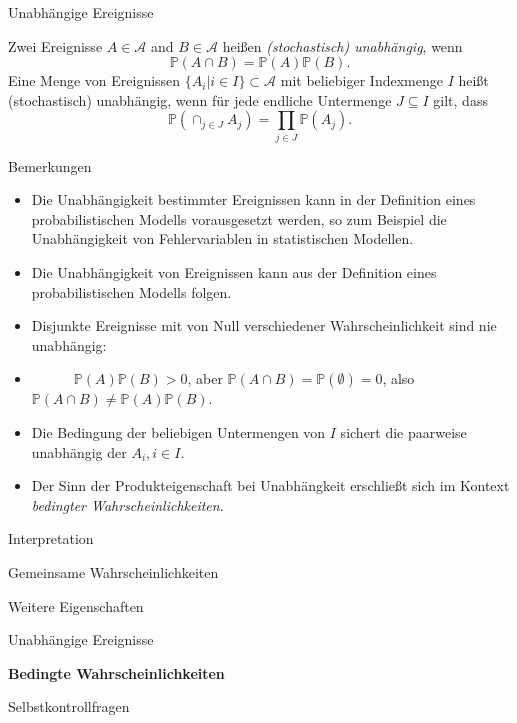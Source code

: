 \documentclass[
  8pt,
  ignorenonframetext,
]{beamer}
\begin{document}
\begin{frame}{Unabhängige Ereignisse}
\protect\hypertarget{unabhuxe4ngige-ereignisse}{}
\small
\begin{definition}
\justifying
Zwei Ereignisse $A \in \mathcal{A}$ and $B \in \mathcal{A}$ heißen
\textit{(stochastisch) unabhängig}, wenn
\begin{equation}
\mathbb{P}(A \cap B) = \mathbb{P}(A)\mathbb{P}(B).
\end{equation}
Eine Menge von Ereignissen $\{A_i|i \in I\}\subset \mathcal{A}$ mit beliebiger
Indexmenge $I$ heißt (stochastisch) unabhängig, wenn für jede endliche Untermenge
$J \subseteq I$ gilt, dass
\begin{equation}
\mathbb{P}\left(\cap_{j \in J} A_j \right) = \prod_{j \in J}\mathbb{P}(A_j).
\end{equation}
\end{definition}
\vspace{-2mm}
\footnotesize

Bemerkungen \vspace{-1mm}

\begin{itemize}
\justifying
\itemsep1mm
\item Die Unabhängigkeit bestimmter Ereignissen kann in der Definition eines
probabilistischen Modells vorausgesetzt werden, so zum Beispiel die Unabhängigkeit
von Fehlervariablen in statistischen Modellen.
\item Die Unabhängigkeit von Ereignissen kann aus der Definition eines probabilistischen Modells folgen.
\item Disjunkte Ereignisse mit von Null verschiedener Wahrscheinlichkeit sind nie unabhängig:
\item[] $\quad\quad\quad \mathbb{P}(A)\mathbb{P}(B) > 0$, aber $\mathbb{P}(A \cap B) = \mathbb{P}(\emptyset) = 0$, also
$\mathbb{P}(A \cap B) \neq \mathbb{P}(A)\mathbb{P}(B)$.
\item Die Bedingung der beliebigen Untermengen von $I$ sichert die paarweise unabhängig der $A_i, i \in I$.
\item Der Sinn der Produkteigenschaft bei Unabhängkeit erschließt sich im Kontext \textit{bedingter Wahrscheinlichkeiten}.
\end{itemize}
\end{frame}

\begin{frame}{}
\protect\hypertarget{section-9}{}
\vfill
\large

Interpretation

Gemeinsame Wahrscheinlichkeiten

Weitere Eigenschaften

Unabhängige Ereignisse

\textbf{Bedingte Wahrscheinlichkeiten}

Selbstkontrollfragen \vfill
\end{frame}
\end{document}

